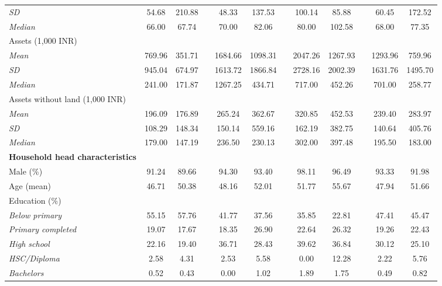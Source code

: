 \begin{table}[htbp]
{\begin{tabular}{lccccccccccc}
    \textit{SD} & 54.68 & 210.88 &   & 48.33 & 137.53 &   & 100.14 & 85.88 &   & 60.45 & 172.52 \\
    \textit{Median} & 66.00 & 67.74 &   & 70.00 & 82.06 &   & 80.00 & 102.58 &   & 68.00 & 77.35 \\
    Assets (1,000 INR) &   &   &   &   &   &   &   &   &   &   &  \\
    \textit{Mean} & 769.96 & 351.71 &   & 1684.66 & 1098.31 &   & 2047.26 & 1267.93 &   & 1293.96 & 759.96 \\
    \textit{SD} & 945.04 & 674.97 &   & 1613.72 & 1866.84 &   & 2728.16 & 2002.39 &   & 1631.76 & 1495.70 \\
    \textit{Median} & 241.00 & 171.87 &   & 1267.25 & 434.71 &   & 717.00 & 452.26 &   & 701.00 & 258.77 \\
    Assets without land (1,000 INR) &   &   &   &   &   &   &   &   &   &   &  \\
    \textit{Mean} & 196.09 & 176.89 &   & 265.24 & 362.67 &   & 320.85 & 452.53 &   & 239.40 & 283.97 \\
    \textit{SD} & 108.29 & 148.34 &   & 150.14 & 559.16 &   & 162.19 & 382.75 &   & 140.64 & 405.76 \\
    \textit{Median} & 179.00 & 147.19 &   & 236.50 & 230.13 &   & 302.00 & 397.48 &   & 195.50 & 183.00 \\
    \textbf{Household head characteristics} &   &   &   &   &   &   &   &   &   &   &  \\
    Male (\%) & 91.24 & 89.66 &   & 94.30 & 93.40 &   & 98.11 & 96.49 &   & 93.33 & 91.98 \\
    Age (mean) & 46.71 & 50.38 &   & 48.16 & 52.01 &   & 51.77 & 55.67 &   & 47.94 & 51.66 \\
    Education (\%) &   &   &   &   &   &   &   &   &   &   &  \\
    \textit{Below primary} & 55.15 & 57.76 &   & 41.77 & 37.56 &   & 35.85 & 22.81 &   & 47.41 & 45.47 \\
    \textit{Primary completed} & 19.07 & 17.67 &   & 18.35 & 26.90 &   & 22.64 & 26.32 &   & 19.26 & 22.43 \\
    \textit{High school} & 22.16 & 19.40 &   & 36.71 & 28.43 &   & 39.62 & 36.84 &   & 30.12 & 25.10 \\
    \textit{HSC/Diploma} & 2.58 & 4.31 &   & 2.53 & 5.58 &   & 0.00 & 12.28 &   & 2.22 & 5.76 \\
    \textit{Bachelors} & 0.52 & 0.43 &   & 0.00 & 1.02 &   & 1.89 & 1.75 &   & 0.49 & 0.82 \\

\end{tabular}}
\end{table}
